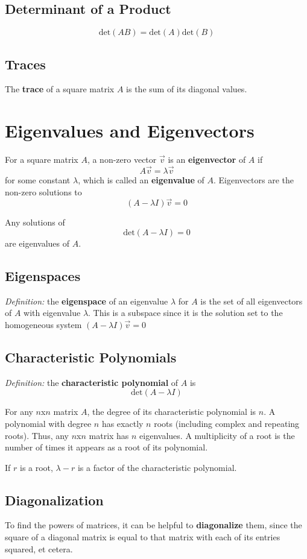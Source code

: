 \documentclass[12pt]{article}
\begin{document}
\subsection*{Determinant of a Product}
\[ \text{det}(AB) = \text{det}(A)\text{det}(B) \]

\subsection*{Traces}
The {\bf trace} of a square matrix $A$ is the sum of its diagonal values.

\section*{Eigenvalues and Eigenvectors}
For a square matrix $A$, a non-zero vector $\vec{v}$ is an {\bf eigenvector} of $A$ if \[ A\vec{v} =\lambda\vec{v} \] for some constant $\lambda$, which is called an {\bf eigenvalue} of $A$. Eigenvectors are the non-zero solutions to \[ (A - \lambda I)\vec{v} = 0 \]

Any solutions of \[ \text{det}(A - \lambda I) = 0 \] are eigenvalues of $A$.

\subsection*{Eigenspaces}
\textit{Definition:} the {\bf eigenspace} of an eigenvalue $\lambda$ for $A$ is the set of all eigenvectors of $A$ with eigenvalue $\lambda$. This is a subspace since it is the solution set to the homogeneous system $(A - \lambda I)\vec{v} = 0$

\subsection*{Characteristic Polynomials}
\textit{Definition:} the {\bf characteristic polynomial} of $A$ is \[ \text{det}(A - \lambda I) \]

For any $n$x$n$ matrix $A$, the degree of its characteristic polynomial is $n$. A polynomial with degree $n$ has exactly $n$ roots (including complex and repeating roots). Thus, any $n$x$n$ matrix has $n$ eigenvalues. A multiplicity of a root is the number of times it appears as a root of its polynomial.

If $r$ is a root, $\lambda - r$ is a factor of the characteristic polynomial.

\subsection*{Diagonalization}
To find the powers of matrices, it can be helpful to {\bf diagonalize} them, since the square of a diagonal matrix is equal to that matrix with each of its entries squared, et cetera.
\end{document}
